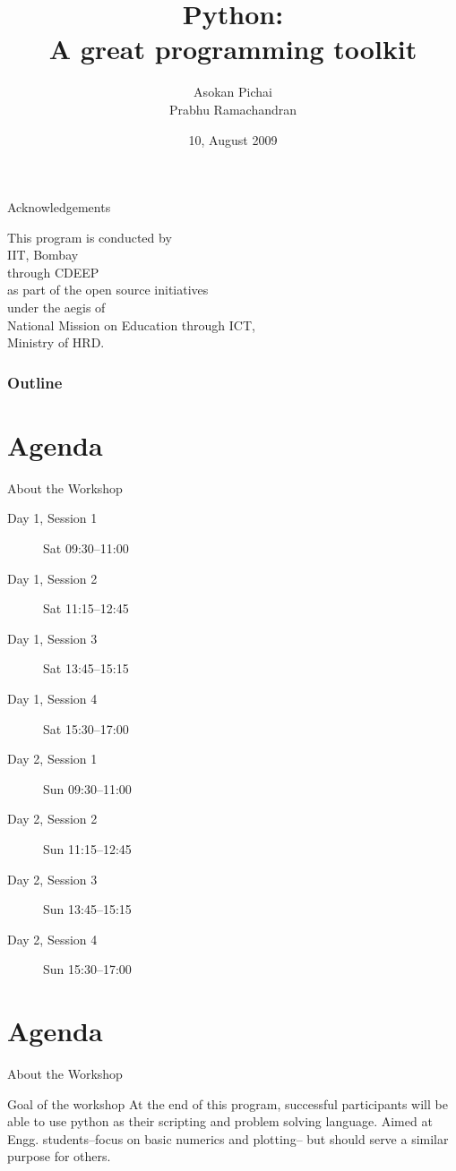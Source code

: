 \documentclass[14pt,compress]{beamer}
\title[Basic Python]{Python:\\A great programming toolkit}
\author[Asokan \& Prabhu] {Asokan Pichai\\Prabhu Ramachandran}
\institute[IIT Bombay] {Department of Aerospace Engineering\\IIT Bombay}
\date[] {10, August 2009}
\begin{document}
\begin{frame}
  \titlepage
\end{frame}
\begin{frame}
  {Acknowledgements}
  \begin{center}
  This program is conducted by\\
  IIT, Bombay\\
  through CDEEP\\as part of  the open source initiatives\\
  under the aegis of\\
  \alert{National Mission on Education through ICT,} \\
  Ministry of HRD.
  \end{center}
\end{frame}

\begin{frame}
  \frametitle{Outline}
  \tableofcontents
\end{frame}

%

\section{Agenda}
\begin{frame}{About the Workshop}
  \begin{description}
	\item[Day 1, Session 1] Sat 09:30--11:00
	\item[Day 1, Session 2] Sat 11:15--12:45
	\item[Day 1, Session 3] Sat 13:45--15:15
	\item[Day 1, Session 4] Sat 15:30--17:00
        \item[Day 2, Session 1] Sun 09:30--11:00
	\item[Day 2, Session 2] Sun 11:15--12:45
	\item[Day 2, Session 3] Sun 13:45--15:15
	\item[Day 2, Session 4] Sun 15:30--17:00
  \end{description}
\end{frame}

\section{Agenda}
\begin{frame}{About the Workshop}
  \begin{block}{Goal of the workshop}
	At the end of this program, successful participants will be able to use python as their scripting and problem solving language. Aimed at Engg. students--focus on basic numerics and plotting-- but should serve a similar purpose for others. 
  \end{block}
\end{frame}
\end{document}
